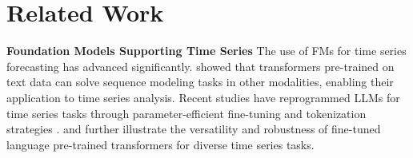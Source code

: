 \section{Related Work}
\label{sec:related-work}

\noindent \textbf{Foundation Models Supporting Time Series} 
The use of FMs for time series forecasting has advanced significantly. 
\cite{lu2022frozen} showed that transformers pre-trained on text data can solve sequence modeling tasks in other modalities, enabling their application to time series analysis. Recent studies have reprogrammed LLMs for time series tasks through parameter-efficient fine-tuning and tokenization strategies \cite{zhou2023one, gruver2024large, jin2023time, cao2023tempo, ekambaram2024tiny}. 
\cite{zhou2023one} and \cite{jin2023time} further illustrate the versatility and robustness of fine-tuned language pre-trained transformers for diverse time series tasks.
